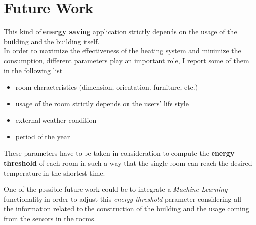 \section{Future Work}
This kind of \textbf{energy saving} application strictly depends on the usage of the building and the building itself.\\
In order to maximize the effectiveness of the heating system and minimize the consumption, different parameters play an important role, I report some of them in the following list
\begin{itemize}
	\item room characteristics (dimension, orientation, furniture, etc.)
	\item usage of the room strictly depends on the users' life style
	\item external weather condition
	\item period of the year
\end{itemize}
These parameters have to be taken in consideration to compute the \textbf{energy threshold} of each room in such a way that the single room can reach the desired temperature in the shortest time.

One of the possible future work could be to integrate a \textit{Machine Learning} functionality in order to adjust this \textit{energy threshold} parameter considering all the information related to the construction of the building and the usage coming from the sensors in the rooms.